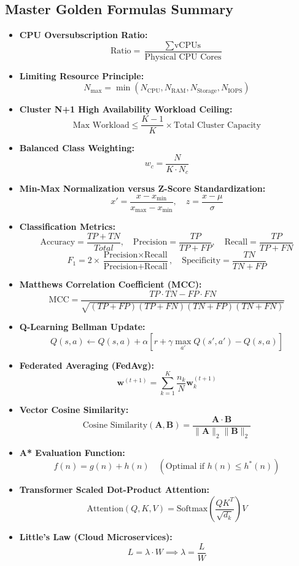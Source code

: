 \subsection*{Master Golden Formulas Summary}
\begin{tcolorbox}[colback=white,colframe=blue!75!black,title=\textbf{Essential Cloud, Virtualization, and Machine Learning Formulas}]
\begin{itemize}[leftmargin=1.5em]
    \item \textbf{CPU Oversubscription Ratio:}
    \[
    \text{Ratio} = \frac{\sum \text{vCPUs}}{\text{Physical CPU Cores}}
    \]
    \item \textbf{Limiting Resource Principle:}
    \[
    N_{\max} = \min(N_{\text{CPU}}, N_{\text{RAM}}, N_{\text{Storage}}, N_{\text{IOPS}})
    \]
    \item \textbf{Cluster N+1 High Availability Workload Ceiling:}
    \[
    \text{Max Workload} \le \frac{K - 1}{K} \times \text{Total Cluster Capacity}
    \]
    \item \textbf{Balanced Class Weighting:}
    \[
    w_c = \frac{N}{K \cdot N_c}
    \]
    \item \textbf{Min-Max Normalization versus Z-Score Standardization:}
    \[
    x' = \frac{x - x_{\min}}{x_{\max} - x_{\min}}, \quad z = \frac{x - \mu}{\sigma}
    \]
    \item \textbf{Classification Metrics:}
    \[
    \text{Accuracy} = \frac{TP + TN}{Total}, \quad \text{Precision} = \frac{TP}{TP + FP}, \quad \text{Recall} = \frac{TP}{TP + FN}
    \]
    \[
    F_1 = 2 \times \frac{\text{Precision} \times \text{Recall}}{\text{Precision} + \text{Recall}}, \quad \text{Specificity} = \frac{TN}{TN + FP}
    \]
    \item \textbf{Matthews Correlation Coefficient (MCC):}
    \[
    \text{MCC} = \frac{TP \cdot TN - FP \cdot FN}{\sqrt{(TP + FP)(TP + FN)(TN + FP)(TN + FN)}}
    \]
    \item \textbf{Q-Learning Bellman Update:}
    \[
    Q(s, a) \leftarrow Q(s, a) + \alpha \left[ r + \gamma \max_{a'} Q(s', a') - Q(s, a) \right]
    \]
    \item \textbf{Federated Averaging (FedAvg):}
    \[
    \mathbf{w}^{(t+1)} = \sum_{k=1}^K \frac{n_k}{N} \mathbf{w}_k^{(t+1)}
    \]
    \item \textbf{Vector Cosine Similarity:}
    \[
    \text{Cosine Similarity}(\mathbf{A}, \mathbf{B}) = \frac{\mathbf{A} \cdot \mathbf{B}}{\|\mathbf{A}\|_2 \|\mathbf{B}\|_2}
    \]
    \item \textbf{A* Evaluation Function:}
    \[
    f(n) = g(n) + h(n) \quad (\text{Optimal if } h(n) \le h^*(n))
    \]
    \item \textbf{Transformer Scaled Dot-Product Attention:}
    \[
    \text{Attention}(Q, K, V) = \text{Softmax}\left( \frac{Q K^T}{\sqrt{d_k}} \right) V
    \]
    \item \textbf{Little's Law (Cloud Microservices):}
    \[
    L = \lambda \cdot W \implies \lambda = \frac{L}{W}
    \]
\end{itemize}
\end{tcolorbox}


